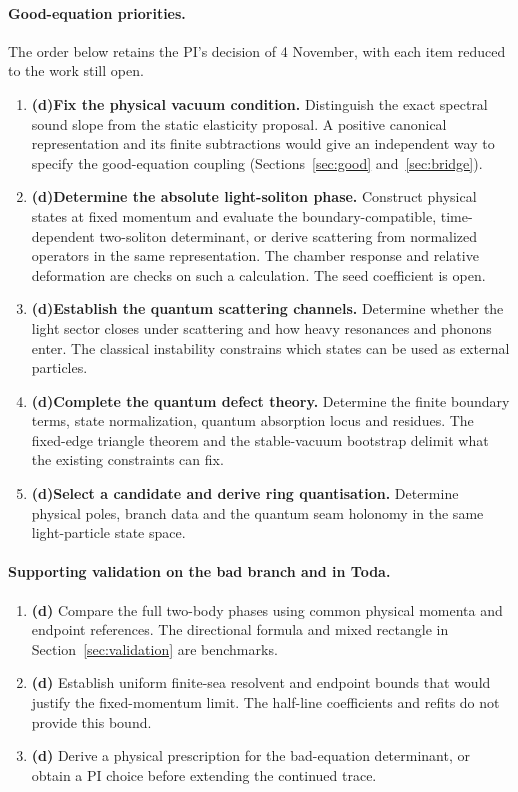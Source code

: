 \documentclass[11pt,a4paper]{article}
\newcommand{\Ld}{\textsf{\textbf{(d)}}\xspace}
\theoremstyle{remark}\newtheorem{remark}[proposition]{Remark}
\begin{document}
\paragraph{Good-equation priorities.}
The order below retains the PI's decision of 4 November, with each item
reduced to the work still open.
\begin{enumerate}
\item \Ld \textbf{Fix the physical vacuum condition.} Distinguish the
exact spectral sound slope from the static elasticity proposal. A positive
canonical representation and its finite subtractions would give an
independent way to specify the good-equation coupling
(Sections~\ref{sec:good} and~\ref{sec:bridge}).
\item \Ld \textbf{Determine the absolute light-soliton phase.} Construct
physical states at fixed momentum and evaluate the boundary-compatible,
time-dependent two-soliton determinant, or derive scattering from normalized
operators in the same representation. The chamber response and relative
deformation are checks on such a calculation. The seed coefficient is open.
\item \Ld \textbf{Establish the quantum scattering channels.} Determine
whether the light sector closes under scattering and how heavy resonances
and phonons enter. The classical instability constrains which states can
be used as external particles.
\item \Ld \textbf{Complete the quantum defect theory.} Determine the finite
boundary terms, state normalization, quantum absorption locus and residues.
The fixed-edge triangle theorem and the stable-vacuum bootstrap delimit
what the existing constraints can fix.
\item \Ld \textbf{Select a candidate and derive ring quantisation.} Determine
physical poles, branch data and the quantum seam holonomy in the same
light-particle state space.
\end{enumerate}

\paragraph{Supporting validation on the bad branch and in Toda.}
\begin{enumerate}
\item[V1.] \Ld Compare the full two-body phases using common physical
momenta and endpoint references. The directional formula and mixed
rectangle in Section~\ref{sec:validation} are benchmarks.
\item[V2.] \Ld Establish uniform finite-sea resolvent and endpoint bounds
that would justify the fixed-momentum limit. The half-line coefficients and
refits do not provide this bound.
\item[V3.] \Ld Derive a physical prescription for the bad-equation
determinant, or obtain a PI choice before extending the continued trace.
\end{enumerate}
\end{document}
